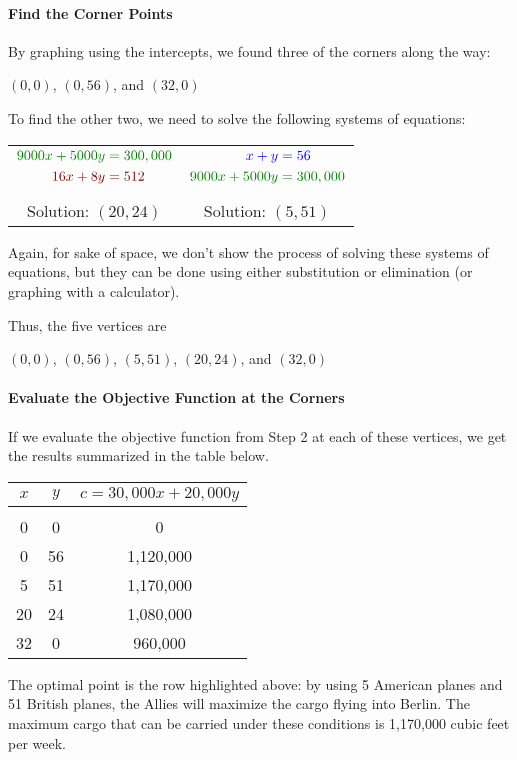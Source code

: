 \paragraph{Find the Corner Points} By graphing using the intercepts, we found three of the corners along the way:
\begin{center}
$(0,0)$, $(0,56)$, and $(32,0)$
\end{center}
To find the other two, we need to solve the following systems of equations:
\begin{center}
\begin{tabular}{c c}
{$\begin{aligned}
\color{green!50!black}9000x+5000y &\color{green!50!black}= 300,000\\
\color{red!50!black}16x+8y &\color{red!50!black}= 512
\end{aligned}$} \hspace*{0.75in}
& 
{$\begin{aligned}
\color{blue}x+y &\color{blue}= 56\\
\color{green!50!black}9000x+5000y &\color{green!50!black}= 300,000
\end{aligned}$}\\
& \\
Solution: $(20,24)$ \hspace*{0.75in} & Solution: $(5,51)$
\end{tabular}
\end{center}

Again, for sake of space, we don't show the process of solving these systems of equations, but they can be done using either substitution or elimination (or graphing with a calculator).

Thus, the five vertices are
\begin{center} 
$(0,0)$, $(0,56)$, $(5,51)$, $(20,24)$, and $(32,0)$
\end{center}

\paragraph{Evaluate the Objective Function at the Corners} If we evaluate the objective function from Step 2 at each of these vertices, we get the results summarized in the table below.
\begin{center}
\begin{tabular}{|c c | c|}
\hline
$x$ & $y$ & $c=30,000x+20,000y$\\
\hline
& & \\
0 & 0 & 0\\
0 & 56 & 1,120,000\\
\rowcolor{green!30!white}5 & 51 & 1,170,000\\
20 & 24 & 1,080,000\\
32 & 0 & 960,000\\
\hline
\end{tabular}
\end{center}

The optimal point is the row highlighted above: by using 5 American planes and 51 British planes, the Allies will maximize the cargo flying into Berlin.  The maximum cargo that can be carried under these conditions is 1,170,000 cubic feet per week.